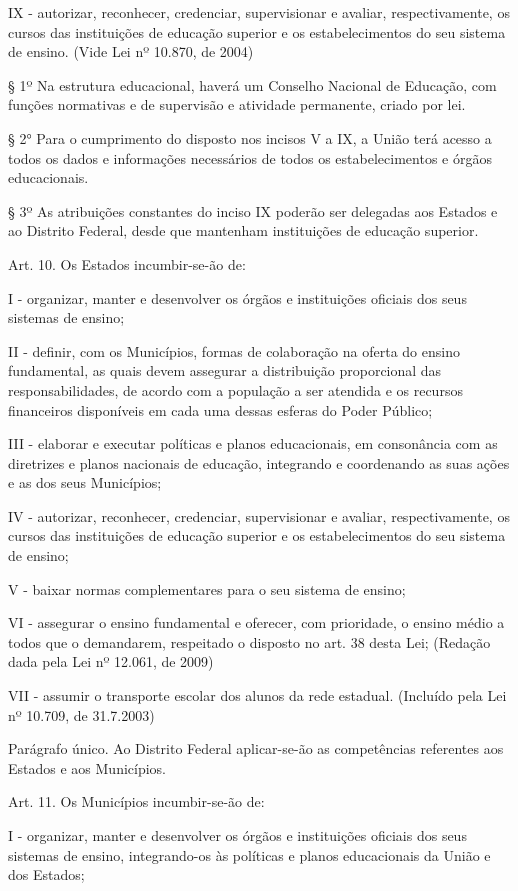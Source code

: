 \documentclass[
]{book}
\begin{document}
IX - autorizar, reconhecer, credenciar, supervisionar e avaliar, respectivamente, os cursos das instituições de educação superior e os estabelecimentos do seu sistema de ensino. (Vide Lei nº 10.870, de 2004)

§ 1º Na estrutura educacional, haverá um Conselho Nacional de Educação, com funções normativas e de supervisão e atividade permanente, criado por lei.

§ 2° Para o cumprimento do disposto nos incisos V a IX, a União terá acesso a todos os dados e informações necessários de todos os estabelecimentos e órgãos educacionais.

§ 3º As atribuições constantes do inciso IX poderão ser delegadas aos Estados e ao Distrito Federal, desde que mantenham instituições de educação superior.

Art. 10. Os Estados incumbir-se-ão de:

I - organizar, manter e desenvolver os órgãos e instituições oficiais dos seus sistemas de ensino;

II - definir, com os Municípios, formas de colaboração na oferta do ensino fundamental, as quais devem assegurar a distribuição proporcional das responsabilidades, de acordo com a população a ser atendida e os recursos financeiros disponíveis em cada uma dessas esferas do Poder Público;

III - elaborar e executar políticas e planos educacionais, em consonância com as diretrizes e planos nacionais de educação, integrando e coordenando as suas ações e as dos seus Municípios;

IV - autorizar, reconhecer, credenciar, supervisionar e avaliar, respectivamente, os cursos das instituições de educação superior e os estabelecimentos do seu sistema de ensino;

V - baixar normas complementares para o seu sistema de ensino;

VI - assegurar o ensino fundamental e oferecer, com prioridade, o ensino médio a todos que o demandarem, respeitado o disposto no art. 38 desta Lei; (Redação dada pela Lei nº 12.061, de 2009)

VII - assumir o transporte escolar dos alunos da rede estadual. (Incluído pela Lei nº 10.709, de 31.7.2003)

Parágrafo único. Ao Distrito Federal aplicar-se-ão as competências referentes aos Estados e aos Municípios.

Art. 11. Os Municípios incumbir-se-ão de:

I - organizar, manter e desenvolver os órgãos e instituições oficiais dos seus sistemas de ensino, integrando-os às políticas e planos educacionais da União e dos Estados;
\end{document}
